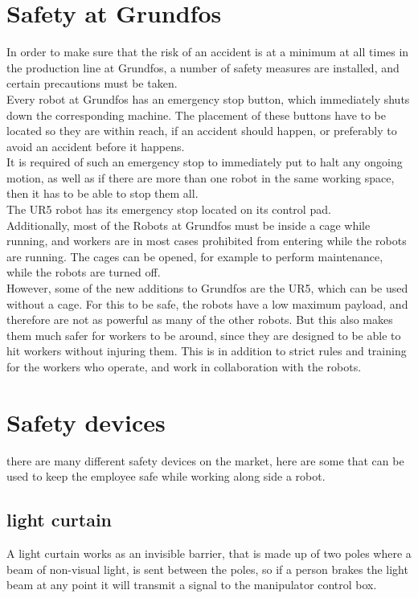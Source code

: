 \section{Safety at Grundfos}\label{ch:Safety at Grundfos}
In order to make sure that the risk of an accident is at a minimum at all times in the production line at Grundfos, a number of safety measures are installed, and certain precautions must be taken.\\

Every robot at Grundfos has an emergency stop button, which immediately shuts down the corresponding machine. The placement of these buttons have to be located so they are within reach, if an accident should happen, or preferably to avoid an accident before it happens. \\
It is required of such an emergency stop to immediately put to halt any ongoing motion, as well as if there are more than one robot in the same working space, then it has to be able to stop them all.\\
The UR5 robot has its emergency stop located on its control pad.\\

Additionally, most of the Robots at Grundfos must be inside a cage while running, and workers are in most cases prohibited from entering while the robots are running. The cages can be opened, for example to perform maintenance, while the robots are turned off.\\

However, some of the new additions to Grundfos are the UR5, which can be used without a cage. For this to be safe, the robots have a low maximum payload, and therefore are not as powerful as many of the other robots. But this also makes them much safer for workers to be around, since they are designed to be able to hit workers without injuring them. This is in addition to strict rules and training for the workers who operate, and work in collaboration with the robots. \\

\section{Safety devices}\label{SafetyDevices}
there are many different safety devices  on the market, here are some that can be used to keep the employee safe while working along side a robot.\\

\subsection{light curtain}
A light curtain works as an invisible barrier, that is made up of two poles where a beam of non-visual light, is sent between the poles, so if a person brakes the light beam at any point it will transmit a signal to the manipulator control box\cite{ligthcurtian}.\\

